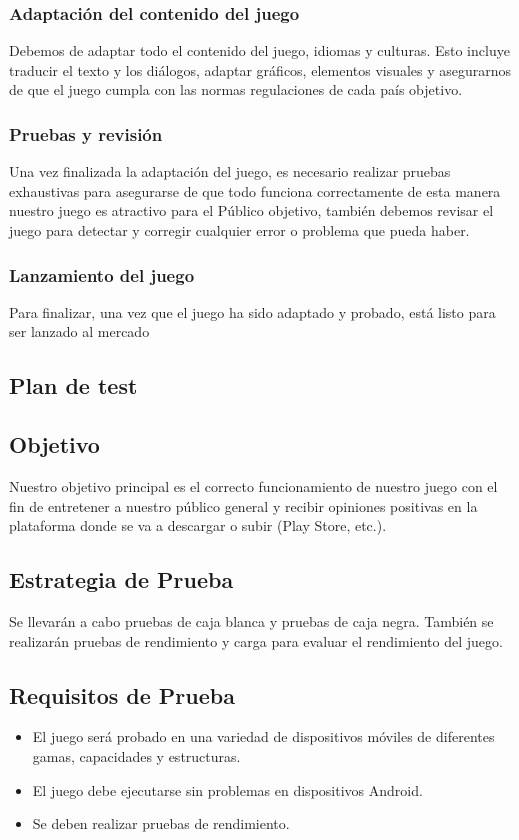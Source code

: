 \subsubsection{Adaptación del contenido del juego}
Debemos de adaptar todo el contenido del juego, idiomas y culturas. Esto incluye traducir el texto y los diálogos, adaptar gráficos, elementos visuales y asegurarnos de que el juego cumpla con las normas regulaciones de cada país objetivo.
\subsubsection{Pruebas y revisión}
Una vez finalizada la adaptación del juego, es necesario realizar pruebas exhaustivas para asegurarse de que todo funciona correctamente de esta manera nuestro juego es atractivo para el Público objetivo, también debemos revisar el juego para detectar y corregir cualquier error o problema que pueda haber.
\subsubsection{Lanzamiento del juego}
Para finalizar, una vez que el juego ha sido adaptado y probado, está listo para ser lanzado al mercado

\subsection{Plan de test}

\subsection{Objetivo}
Nuestro objetivo principal es el correcto funcionamiento de nuestro juego con el fin de entretener a nuestro público general y recibir opiniones positivas en la plataforma donde se va a descargar o subir (Play Store, etc.).

\subsection{Estrategia de Prueba}
Se llevarán a cabo pruebas de caja blanca y pruebas de caja negra. También se realizarán pruebas de rendimiento y carga para evaluar el rendimiento del juego.

\subsection{Requisitos de Prueba}
\begin{itemize}
	\item El juego será probado en una variedad de dispositivos móviles de diferentes gamas, capacidades y estructuras.
	\item El juego debe ejecutarse sin problemas en dispositivos Android.
	\item Se deben realizar pruebas de rendimiento.
\end{itemize}

